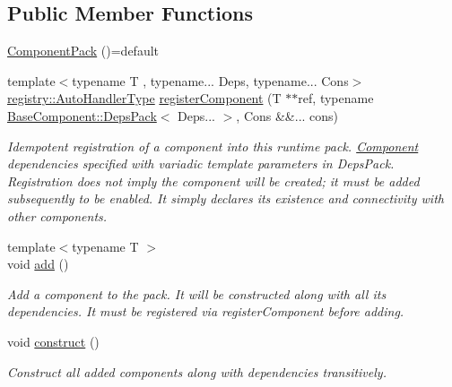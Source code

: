 \subsection*{Public Member Functions}
\begin{DoxyCompactItemize}
\item 
\hyperlink{structvt_1_1runtime_1_1component_1_1_component_pack_a113f2da49d2033f09831b6807c92d330}{Component\+Pack} ()=default
\item 
{\footnotesize template$<$typename T , typename... Deps, typename... Cons$>$ }\\\hyperlink{namespacevt_1_1runtime_1_1component_1_1registry_a9b86518797c7bb91babf0ca8ee7d06e6}{registry\+::\+Auto\+Handler\+Type} \hyperlink{structvt_1_1runtime_1_1component_1_1_component_pack_a956437fba91b2b90576df33276858df5}{register\+Component} (T $\ast$$\ast$ref, typename \hyperlink{structvt_1_1runtime_1_1component_1_1_base_component_1_1_deps_pack}{Base\+Component\+::\+Deps\+Pack}$<$ Deps... $>$, Cons \&\&... cons)
\begin{DoxyCompactList}\small\item\em Idempotent registration of a component into this runtime pack. \hyperlink{structvt_1_1runtime_1_1component_1_1_component}{Component} dependencies specified with variadic template parameters in {\ttfamily Deps\+Pack}. Registration does not imply the component will be created; it must be added subsequently to be enabled. It simply declares its existence and connectivity with other components. \end{DoxyCompactList}\item 
{\footnotesize template$<$typename T $>$ }\\void \hyperlink{structvt_1_1runtime_1_1component_1_1_component_pack_a2be733d29f56456f71352569a898dee5}{add} ()
\begin{DoxyCompactList}\small\item\em Add a component to the pack. It will be constructed along with all its dependencies. It must be registered via {\ttfamily register\+Component} before adding. \end{DoxyCompactList}\item 
void \hyperlink{structvt_1_1runtime_1_1component_1_1_component_pack_ab5f7966f4de3f81643d9945302de7cfa}{construct} ()
\begin{DoxyCompactList}\small\item\em Construct all added components along with dependencies transitively. \end{DoxyCompactList}\item 
$$
\end{DoxyCompactItemize}
